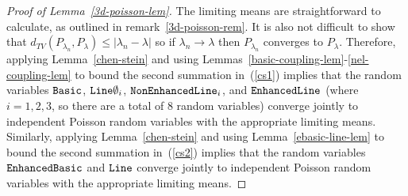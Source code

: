 \documentclass{amsart}
\newcommand{\abs}[1]{\left|#1\right|}
\newcommand{\basic}{\operatorname{\tt Basic}}
\newcommand{\lin}{\operatorname{\tt Line}}
\newcommand{\oline}{\operatorname{\tt  Line\emptyset}}
\newcommand{\eline}{\operatorname{\tt Enhanced Line}}
\newcommand{\ebasic}{\operatorname{\tt Enhanced Basic}}
\newcommand{\neline}{\operatorname{\tt NonEnhancedLine}}
\numberwithin{equation}{section}
\theoremstyle{definition}
\theoremstyle{remark}
\begin{document}
\begin{proof}[Proof of Lemma~\ref{3d-poisson-lem}]
The limiting means are straightforward to calculate, as outlined in remark~\ref{3d-poisson-rem}.  It is also not difficult to show that $d_{TV}(P_{\lambda_n},P_{\lambda}) \leq \abs{\lambda_n-\lambda}$ so if $\lambda_n \to \lambda$ then $P_{\lambda_n}$ converges to $P_\lambda$.  Therefore, applying Lemma~\ref{chen-stein} and using Lemmas~\ref{basic-coupling-lem}-\ref{nel-coupling-lem} to bound the second summation in~(\ref{cs1}) implies that the random variables $\basic$, $\oline_i$, $\neline_i$, and $\eline$ (where $i=1,2,3$, so there are a total of 8 random variables) converge jointly to independent Poisson random variables with the appropriate limiting means.  Similarly, applying Lemma~\ref{chen-stein} and using Lemma~\ref{ebasic-line-lem} to bound the second summation in~(\ref{cs2}) implies that the random variables $\ebasic$ and $\lin$ converge jointly to independent Poisson random variables with the appropriate limiting means.
\end{proof}



%
%
\end{document}
